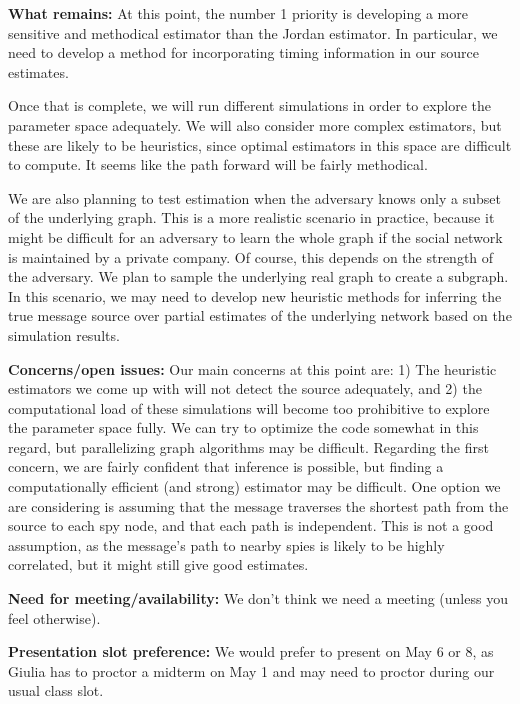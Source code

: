 \documentclass[11pt, onecolumn]{article}
\begin{document}
\vspace{0.1in}
\textbf{What remains:} At this point, the number 1 priority is developing a more sensitive and methodical estimator than the Jordan estimator. In particular, we need to develop a method for incorporating timing information in our source estimates. 

Once that is complete, we will run different simulations in order to explore the parameter space adequately. We will also consider more complex estimators, but these are likely to be heuristics, since optimal estimators in this space are difficult to compute. It seems like the path forward will be fairly methodical.

We are also planning to test estimation when the adversary knows only a subset of the underlying graph. This is a more realistic scenario in practice, because it might be difficult for an adversary to learn the whole graph if the social network is maintained by a private company. Of course, this depends on the strength of the adversary. 
We plan to sample the underlying real graph to create a subgraph.
In this scenario, we may need to develop new heuristic methods for inferring the true message source over partial estimates of the underlying network based on the simulation results.

\vspace{0.1in}
\textbf{Concerns/open issues:}
Our main concerns at this point are: 1) The heuristic estimators we come up with will not detect the source adequately, and 2) the computational load of these simulations will become too prohibitive to explore the parameter space fully. We can try to optimize the code somewhat in this regard, but parallelizing graph algorithms may be difficult. 
Regarding the first concern, we are fairly confident that inference is possible, but finding a computationally efficient (and strong) estimator may be difficult. One option we are considering is assuming that the message traverses the shortest path from the source to each spy node, and that each path is independent. This is not a good assumption, as the message's path to nearby spies is likely to be highly correlated, but it might still give good estimates.

\vspace{0.1in}
\textbf{Need for meeting/availability:} We don't think we need a meeting (unless you feel otherwise).

\vspace{0.1in}
\textbf{Presentation slot preference:} We would prefer to present on May 6 or 8, as Giulia has to proctor a midterm on May 1 and may need to proctor during our usual class slot.
%
%
\end{document}
